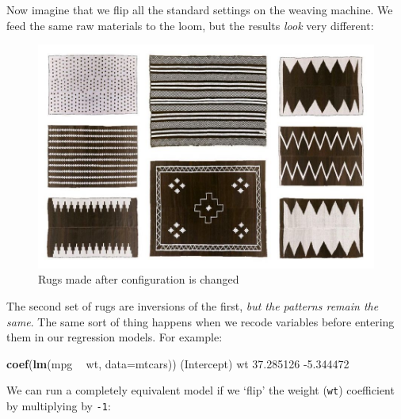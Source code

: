 \documentclass[]{article}
\newenvironment{Shaded}{\begin{snugshade}}{\end{snugshade}}
\newcommand{\DataTypeTok}[1]{\textcolor[rgb]{0.13,0.29,0.53}{#1}}
\newcommand{\DecValTok}[1]{\textcolor[rgb]{0.00,0.00,0.81}{#1}}
\newcommand{\FloatTok}[1]{\textcolor[rgb]{0.00,0.00,0.81}{#1}}
\newcommand{\KeywordTok}[1]{\textcolor[rgb]{0.13,0.29,0.53}{\textbf{#1}}}
\newcommand{\NormalTok}[1]{#1}
\newcommand{\OperatorTok}[1]{\textcolor[rgb]{0.81,0.36,0.00}{\textbf{#1}}}
\newcommand{\StringTok}[1]{\textcolor[rgb]{0.31,0.60,0.02}{#1}}
\begin{document}
Now imagine that we flip all the standard settings on the weaving machine. We
feed the same raw materials to the loom, but the results \emph{look} very different:

\begin{figure}
\centering
\includegraphics{media/rugs2.jpg}
\caption{Rugs made after configuration is changed}
\end{figure}

The second set of rugs are inversions of the first, \emph{but the patterns remain the
same}. The same sort of thing happens when we recode variables before entering
them in our regression models. For example:

\begin{Shaded}
\begin{Highlighting}[]
\KeywordTok{coef}\NormalTok{(}\KeywordTok{lm}\NormalTok{(mpg }\OperatorTok{~}\StringTok{ }\NormalTok{wt, }\DataTypeTok{data=}\NormalTok{mtcars))}
\NormalTok{(Intercept)          wt }
  \FloatTok{37.285126}   \FloatTok{-5.344472} 
\end{Highlighting}
\end{Shaded}

We can run a completely equivalent model if we `flip' the weight (\texttt{wt})
coefficient by multiplying by \texttt{-1}:

\begin{Shaded}
\end{Shaded}
\end{document}
